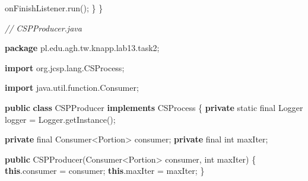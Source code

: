 \documentclass[11pt]{article}
\newenvironment{Shaded}{}{}
\newcommand{\KeywordTok}[1]{\textcolor[rgb]{0.00,0.44,0.13}{\textbf{{#1}}}}
\newcommand{\DataTypeTok}[1]{\textcolor[rgb]{0.56,0.13,0.00}{{#1}}}
\newcommand{\CommentTok}[1]{\textcolor[rgb]{0.38,0.63,0.69}{\textit{{#1}}}}
\newcommand{\FunctionTok}[1]{\textcolor[rgb]{0.02,0.16,0.49}{{#1}}}
\newcommand{\NormalTok}[1]{{#1}}
\newcommand{\ImportTok}[1]{{#1}}
\newcommand{\OperatorTok}[1]{\textcolor[rgb]{0.40,0.40,0.40}{{#1}}}
\newcommand{\BuiltInTok}[1]{{#1}}
\begin{document}
\begin{Shaded}
\begin{Highlighting}[]
\NormalTok{        onFinishListener}\OperatorTok{.}\FunctionTok{run}\OperatorTok{();}
    \OperatorTok{\}}
\OperatorTok{\}}
\end{Highlighting}
\end{Shaded}

    \begin{Shaded}
\begin{Highlighting}[]
\CommentTok{// CSPProducer.java}

\KeywordTok{package}\ImportTok{ pl}\OperatorTok{.}\ImportTok{edu}\OperatorTok{.}\ImportTok{agh}\OperatorTok{.}\ImportTok{tw}\OperatorTok{.}\ImportTok{knapp}\OperatorTok{.}\ImportTok{lab13}\OperatorTok{.}\ImportTok{task2}\OperatorTok{;}

\KeywordTok{import} \ImportTok{org}\OperatorTok{.}\ImportTok{jcsp}\OperatorTok{.}\ImportTok{lang}\OperatorTok{.}\ImportTok{CSProcess}\OperatorTok{;}

\KeywordTok{import} \ImportTok{java}\OperatorTok{.}\ImportTok{util}\OperatorTok{.}\ImportTok{function}\OperatorTok{.}\ImportTok{Consumer}\OperatorTok{;}

\KeywordTok{public} \KeywordTok{class}\NormalTok{ CSPProducer }\KeywordTok{implements}\NormalTok{ CSProcess }\OperatorTok{\{}
    \KeywordTok{private} \DataTypeTok{static} \DataTypeTok{final} \BuiltInTok{Logger}\NormalTok{ logger }\OperatorTok{=} \BuiltInTok{Logger}\OperatorTok{.}\FunctionTok{getInstance}\OperatorTok{();}

    \KeywordTok{private} \DataTypeTok{final}\NormalTok{ Consumer}\OperatorTok{\textless{}}\NormalTok{Portion}\OperatorTok{\textgreater{}}\NormalTok{ consumer}\OperatorTok{;}
    \KeywordTok{private} \DataTypeTok{final} \DataTypeTok{int}\NormalTok{ maxIter}\OperatorTok{;}

    \KeywordTok{public} \FunctionTok{CSPProducer}\OperatorTok{(}\NormalTok{Consumer}\OperatorTok{\textless{}}\NormalTok{Portion}\OperatorTok{\textgreater{}}\NormalTok{ consumer}\OperatorTok{,} \DataTypeTok{int}\NormalTok{ maxIter}\OperatorTok{)} \OperatorTok{\{}
        \KeywordTok{this}\OperatorTok{.}\FunctionTok{consumer} \OperatorTok{=}\NormalTok{ consumer}\OperatorTok{;}
        \KeywordTok{this}\OperatorTok{.}\FunctionTok{maxIter} \OperatorTok{=}\NormalTok{ maxIter}\OperatorTok{;}
    \OperatorTok{\}}


\end{Highlighting}
\end{Shaded}
\end{document}
